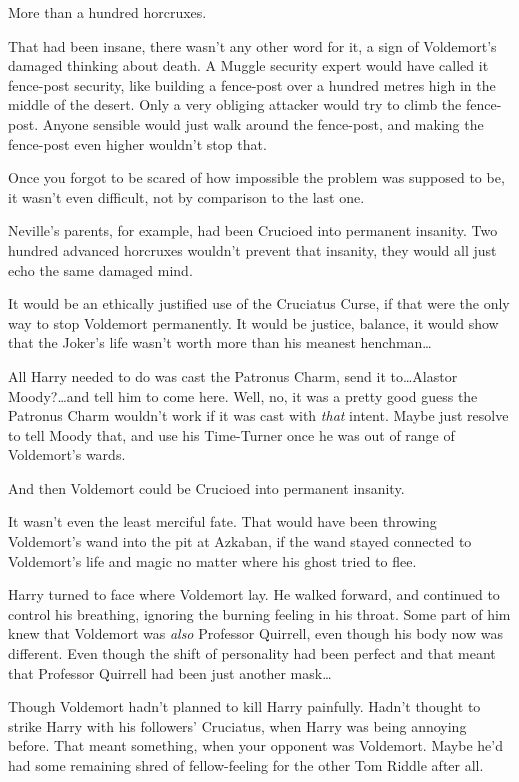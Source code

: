 More than a hundred horcruxes.

That had been insane, there wasn’t any other word for it, a sign of Voldemort’s damaged thinking about death. A Muggle security expert would have called it fence-post security, like building a fence-post over a hundred metres high in the middle of the desert. Only a very obliging attacker would try to climb the fence-post. Anyone sensible would just walk around the fence-post, and making the fence-post even higher wouldn’t stop that.

Once you forgot to be scared of how impossible the problem was supposed to be, it wasn’t even difficult, not by comparison to the last one.

Neville’s parents, for example, had been Crucioed into permanent insanity. Two hundred advanced horcruxes wouldn’t prevent that insanity, they would all just echo the same damaged mind.

It would be an ethically justified use of the Cruciatus Curse, if that were the only way to stop Voldemort permanently. It would be justice, balance, it would show that the Joker’s life wasn’t worth more than his meanest henchman…

All Harry needed to do was cast the Patronus Charm, send it to…Alastor Moody?…and tell him to come here. Well, no, it was a pretty good guess the Patronus Charm wouldn’t work if it was cast with \emph{that} intent. Maybe just resolve to tell Moody that, and use his Time-Turner once he was out of range of Voldemort’s wards.

And then Voldemort could be Crucioed into permanent insanity.

It wasn’t even the least merciful fate. That would have been throwing Voldemort’s wand into the pit at Azkaban, if the wand stayed connected to Voldemort’s life and magic no matter where his ghost tried to flee.

Harry turned to face where Voldemort lay. He walked forward, and continued to control his breathing, ignoring the burning feeling in his throat. Some part of him knew that Voldemort was \emph{also} Professor Quirrell, even though his body now was different. Even though the shift of personality had been perfect and that meant that Professor Quirrell had been just another mask…

Though Voldemort hadn’t planned to kill Harry painfully. Hadn’t thought to strike Harry with his followers’ Cruciatus, when Harry was being annoying before. That meant something, when your opponent was Voldemort. Maybe he’d had some remaining shred of fellow-feeling for the other Tom Riddle after all.

